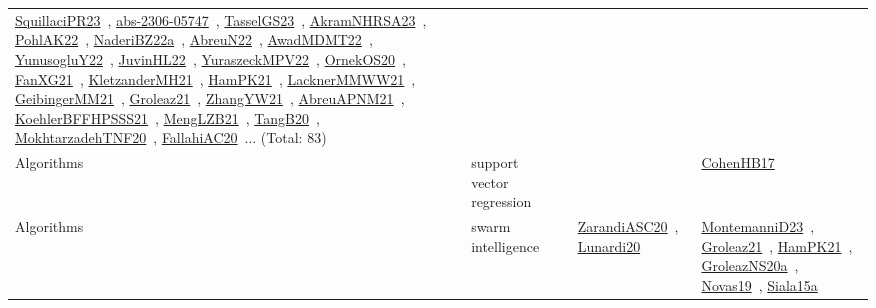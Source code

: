 {\begin{longtable}{lp{3cm}>{\raggedright\arraybackslash}p{6cm}>{\raggedright\arraybackslash}p{6cm}>{\raggedright\arraybackslash}p{8cm}}
\href{../works/SquillaciPR23.pdf}{SquillaciPR23}~\cite{SquillaciPR23}, \href{../works/abs-2306-05747.pdf}{abs-2306-05747}~\cite{abs-2306-05747}, \href{../works/TasselGS23.pdf}{TasselGS23}~\cite{TasselGS23}, \href{../works/AkramNHRSA23.pdf}{AkramNHRSA23}~\cite{AkramNHRSA23}, \href{../works/PohlAK22.pdf}{PohlAK22}~\cite{PohlAK22}, \href{../works/NaderiBZ22a.pdf}{NaderiBZ22a}~\cite{NaderiBZ22a}, \href{../works/AbreuN22.pdf}{AbreuN22}~\cite{AbreuN22}, \href{../works/AwadMDMT22.pdf}{AwadMDMT22}~\cite{AwadMDMT22}, \href{../works/YunusogluY22.pdf}{YunusogluY22}~\cite{YunusogluY22}, \href{../works/JuvinHL22.pdf}{JuvinHL22}~\cite{JuvinHL22}, \href{../works/YuraszeckMPV22.pdf}{YuraszeckMPV22}~\cite{YuraszeckMPV22}, \href{../works/OrnekOS20.pdf}{OrnekOS20}~\cite{OrnekOS20}, \href{../works/FanXG21.pdf}{FanXG21}~\cite{FanXG21}, \href{../works/KletzanderMH21.pdf}{KletzanderMH21}~\cite{KletzanderMH21}, \href{../works/HamPK21.pdf}{HamPK21}~\cite{HamPK21}, \href{../works/LacknerMMWW21.pdf}{LacknerMMWW21}~\cite{LacknerMMWW21}, \href{../works/GeibingerMM21.pdf}{GeibingerMM21}~\cite{GeibingerMM21}, \href{../works/Groleaz21.pdf}{Groleaz21}~\cite{Groleaz21}, \href{../works/ZhangYW21.pdf}{ZhangYW21}~\cite{ZhangYW21}, \href{../works/AbreuAPNM21.pdf}{AbreuAPNM21}~\cite{AbreuAPNM21}, \href{../works/KoehlerBFFHPSSS21.pdf}{KoehlerBFFHPSSS21}~\cite{KoehlerBFFHPSSS21}, \href{../works/MengLZB21.pdf}{MengLZB21}~\cite{MengLZB21}, \href{../works/TangB20.pdf}{TangB20}~\cite{TangB20}, \href{../works/MokhtarzadehTNF20.pdf}{MokhtarzadehTNF20}~\cite{MokhtarzadehTNF20}, \href{../works/FallahiAC20.pdf}{FallahiAC20}~\cite{FallahiAC20}... (Total: 83)\\
\index{support vector regression}\index{Algorithms!support vector regression}Algorithms & support vector regression &  &  & \href{../works/CohenHB17.pdf}{CohenHB17}~\cite{CohenHB17}\\
\index{swarm intelligence}\index{Algorithms!swarm intelligence}Algorithms & swarm intelligence &  & \href{../works/ZarandiASC20.pdf}{ZarandiASC20}~\cite{ZarandiASC20}, \href{../works/Lunardi20.pdf}{Lunardi20}~\cite{Lunardi20} & \href{../works/MontemanniD23.pdf}{MontemanniD23}~\cite{MontemanniD23}, \href{../works/Groleaz21.pdf}{Groleaz21}~\cite{Groleaz21}, \href{../works/HamPK21.pdf}{HamPK21}~\cite{HamPK21}, \href{../works/GroleazNS20a.pdf}{GroleazNS20a}~\cite{GroleazNS20a}, \href{../works/Novas19.pdf}{Novas19}~\cite{Novas19}, \href{../works/Siala15a.pdf}{Siala15a}~\cite{Siala15a}\\

\end{longtable}}
